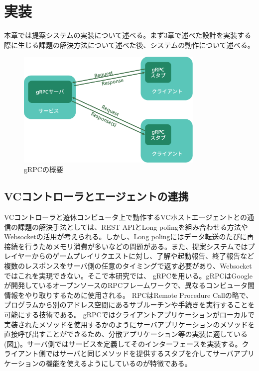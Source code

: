 \section{実装}
本章では提案システムの実装について述べる。まず3章で述べた設計を実装する際に生じる課題の解決方法について述べた後、システムの動作について述べる。




\begin{figure}[t]
    \centering
    \includegraphics[width=0.8\textwidth,keepaspectratio,clip]{img/grpc.eps}
    \caption{gRPCの概要}
    \label{fig:grpc}
\end{figure}

\subsection{VCコントローラとエージェントの連携}
VCコントローラと遊休コンピュータ上で動作するVCホストエージェントとの通信の課題の解決手法としては、REST APIとLong poling\cite{longpoling}を組み合わせる方法やWebsocket\cite{websocket}の活用が考えられる。しかし、Long polingにはデータ転送のたびに再接続を行うためメモリ消費が多いなどの問題がある。また、提案システムではプレイヤーからのゲームプレイリクエストに対し、了解や起動報告、終了報告など複数のレスポンスをサーバ側の任意のタイミングで返す必要があり、Websocketではこれを実現できない。そこで本研究では、
gRPC\cite{grpc}を用いる。gRPCはGoogleが開発しているオープンソースのRPCフレームワークで、異なるコンピュータ間情報をやり取りするために使用される。
RPCはRemote Procedure Callの略で、プログラムから別のアドレス空間にあるサブルーチンや手続きを実行することを可能にする技術である。
gRPCではクライアントアプリケーションがローカルで実装されたメソッドを使用するかのようにサーバアプリケーションのメソッドを直接呼び出すことができるため、分散アプリケーション等の実装に適している(図\ref{fig:grpc})。サーバ側ではサービスを定義してそのインターフェースを実装する。クライアント側ではサーバと同じメソッドを提供するスタブを介してサーバアプリケーションの機能を使えるようにしているのが特徴である。


